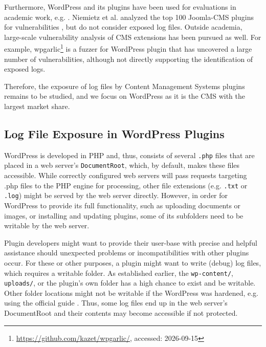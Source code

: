\documentclass[sigconf]{acmart}
\begin{document}
Furthermore, WordPress and its plugins have been used for evaluations in academic work, e.g.  \cite{tashenova2026sentinelcms,shezan2023chkplug,neef2024all}.
Niemietz et al. analyzed the top 100 Joomla-CMS plugins for vulnerabilities \cite{niemietz2021100bugsrowsecurity}, but do not consider exposed log files. 
Outside academia, large-scale vulnerability analysis of CMS extensions has been pursued as well. For example, wpgarlic\footnote{\url{https://github.com/kazet/wpgarlic/}, accessed: 2026-09-15} is a fuzzer for WordPress plugin that has uncovered a large number of vulnerabilities, although not directly supporting the identification of exposed logs. 

Therefore, the exposure of log files by Content Management Systems plugins remains to be studied, and we focus on WordPress as it is the CMS with the largest market share.

\subsection{Log File Exposure in WordPress Plugins}
WordPress is developed in PHP and, thus, consists of several \texttt{.php} files that are placed in a web server's \texttt{DocumentRoot}, which, by default, makes these files accessible. 
While correctly configured web servers will pass requests targeting \texttt{}{.php} files to the PHP engine for processing, other file extensions (e.g. \texttt{.txt} or \texttt{.log}) might be served by the web server directly.
However, in order for WordPress to provide its full functionality, such as uploading documents or images, or installing and updating plugins, some of its subfolders need to be writable by the web server. 

Plugin developers might want to provide their user-base with precise and helpful assistance should unexpected problems or incompatibilities with other plugins occur.
For these or other purposes, a plugin might want to write (debug) log files, which requires a writable folder.
As established earlier, the \texttt{wp-content/}, \texttt{uploads/}, or the plugin's own folder has a high chance to exist and be writable. 
Other folder locations might not be writable if the WordPress was hardened, e.g. using the official guide \cite{wordpressHardeningWordPress}. 
Thus, some log files end up in the web server's DocumentRoot and their contents may become accessible if not protected. 
\end{document}

